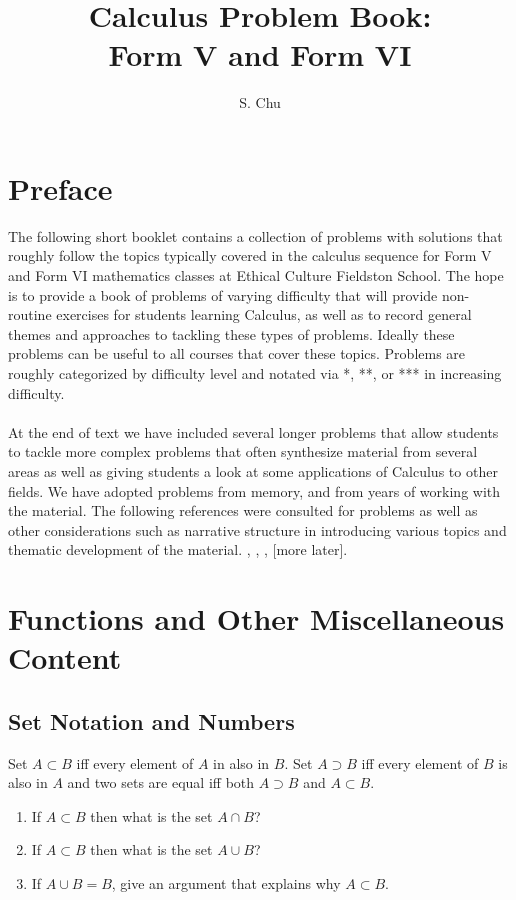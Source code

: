 \documentclass{amsbook}
\begin{document}
\title{Calculus Problem Book:\\
    \Large Form V and Form VI}


\author{S. Chu}

\maketitle
\tableofcontents
\chapter*{Preface}
The following short booklet contains a collection of problems with solutions that roughly follow the topics typically covered in the calculus sequence for Form V and Form VI mathematics classes at Ethical Culture Fieldston School. The hope is to provide a book of problems of varying difficulty that will provide non-routine exercises for students learning Calculus, as well as to record general themes and approaches to tackling these types of problems. Ideally these problems can be useful to all courses that cover these topics. Problems are roughly categorized by difficulty level and notated via *, **, or *** in increasing difficulty.\\ \\
At the end of text we have included several longer problems that allow students to tackle more complex problems that often synthesize material from several areas as well as giving students a look at some applications of Calculus to other fields. We have adopted problems from memory, and from years of working with the material. The following references were consulted for problems as well as other considerations such as narrative structure in introducing various topics and thematic development of the material. \cite{mcirc}, \cite{aops}, \textcite{spk}, [more later].
\chapter{Functions and Other Miscellaneous Content}

\section{Set Notation and Numbers}
\begin{Exercise}[title={Sets, Unions and Intersections}, difficulty = 0, label= 1b1]
	Set $A \subset B$ iff every element of $A$ in also in $B$. Set $A \supset B$ iff every element of $B$ is also in $A$ and two sets are equal iff both $A\supset B$ and $A\subset B$. 
	\begin{enumerate}
		\item If $A \subset B$ then what is the set $A \cap B$?\\
		\item If $A \subset B$ then what is the set $A \cup B$?\\
		\item If $A \cup B = B$, give an argument that explains why $A \subset B$.
	\end{enumerate}
	
\end{Exercise}
\end{document}
